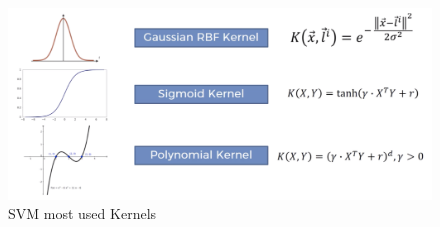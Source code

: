 
\begin{figure}[h]
\centering
\includegraphics[width=14cm]{figures/Ch2/Kernels.png}
\caption{SVM most used Kernels}
\label{f:SVM-kernels}
\end{figure}




